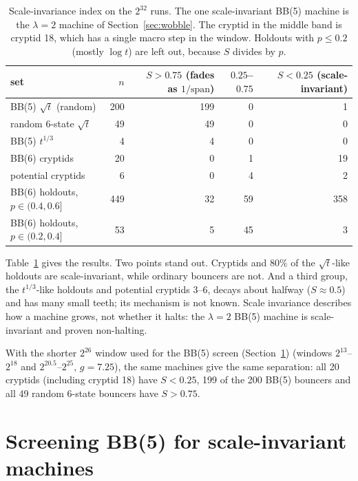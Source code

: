 \documentclass[11pt,a4paper]{article}
\newcommand{\BB}[1]{BB(#1)}
\begin{document}
\begin{table}[h]
\centering\small
\begin{tabular}{@{}lrrrr@{}}
\toprule
set & $n$ & $S > 0.75$ (fades as $1/\mathrm{span}$) & $0.25$--$0.75$ & $S < 0.25$ (scale-invariant)\\
\midrule
BB(5) $\sqrt t$ (random) & 200 & 199 & 0 & 1\\
random 6-state $\sqrt t$ & 49 & 49 & 0 & 0\\
BB(5) $t^{1/3}$ & 4 & 4 & 0 & 0\\
\BB{6} cryptids & 20 & 0 & 1 & 19\\
potential cryptids & 6 & 0 & 4 & 2\\
\BB{6} holdouts, $p \in (0.4, 0.6]$ & 449 & 32 & 59 & 358\\
\BB{6} holdouts, $p \in (0.2, 0.4]$ & 53 & 5 & 45 & 3\\
\bottomrule
\end{tabular}
\caption{Scale-invariance index on the $2^{32}$ runs. The one scale-invariant BB(5) machine is the
$\lambda = 2$ machine of Section~\ref{sec:wobble}. The cryptid in the middle band is cryptid 18,
which has a single macro step in the window. Holdouts with $p \le 0.2$ (mostly $\log t$) are left
out, because $S$ divides by $p$.}
\label{tab:decay}
\end{table}

Table~\ref{tab:decay} gives the results. Two points stand out. Cryptids and 80\% of the $\sqrt t$-like holdouts are scale-invariant, while
ordinary bouncers are not. And a third group, the $t^{1/3}$-like holdouts and potential cryptids
3--6, decays about halfway ($S \approx 0.5$) and has many small teeth; its mechanism is not
known. Scale invariance describes how a machine grows, not whether it halts: the $\lambda = 2$
\BB{5} machine is scale-invariant and proven non-halting.

With the shorter $2^{26}$ window used for the \BB{5} screen (Section~\ref{sec:screen}) (windows $2^{13}$--$2^{18}$ and
$2^{20.5}$--$2^{25}$, $g = 7.25$), the same machines give the same separation: all 20 cryptids
(including cryptid 18) have $S < 0.25$, 199 of the 200 BB(5) bouncers and all 49 random 6-state
bouncers have $S > 0.75$.

\section{Screening BB(5) for scale-invariant machines}
\label{sec:screen}
\end{document}
